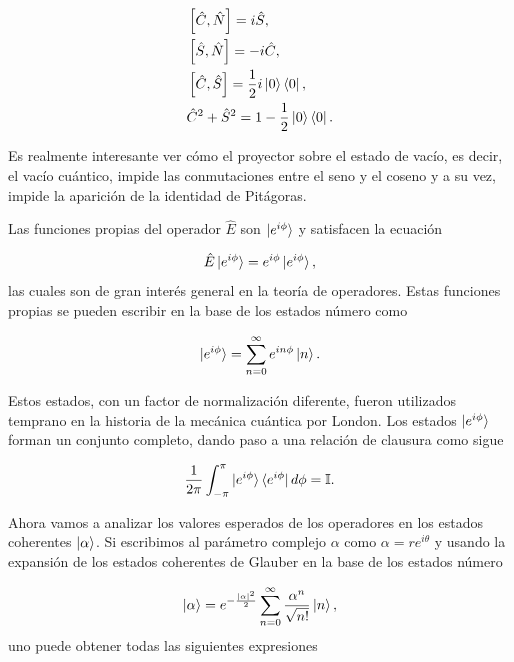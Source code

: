 	    \begin{align}
	        & \left[ \hat{C},\hat{N} \right] = i \hat{S},\\
	        & \left[ \hat{S},\hat{N} \right] = -i\hat{C},\\
	        & \left[ \hat{C},\hat{S} \right] = \frac{1}{2}i \ket{0}\bra{0},\\
	        & \hat{C}^2+\hat{S}^2 = 1 - \frac{1}{2}\ket{0}\bra{0}.
	    \end{align}
	
	    Es realmente interesante ver cómo el proyector sobre el estado de vacío, es decir, el vacío cuántico, impide las conmutaciones entre el seno y el coseno y a su vez, impide la aparición de la identidad de Pitágoras.
	
	    Las funciones propias del operador $\hat{E}$ son $\ket{e^{i\phi}}$ y satisfacen la ecuación
	
	    \begin{equation}
	        \hat{E}\ket{e^{i\phi}} = e^{i\phi}\ket{e^{i\phi}},
	    \end{equation}
	    las cuales son de gran interés general en la teoría de operadores. Estas funciones propias se pueden escribir en la base de los estados número como
	
	    \begin{equation}
	        \ket{e^{i\phi}} = \sum_{n=0}^\infty e^{in\phi}\ket{n}.
	    \end{equation}
	
	    Estos estados, con un factor de normalización diferente, fueron utilizados temprano en la historia de la mecánica cuántica por London. Los estados $\ket{e^{i\phi}}$ forman un conjunto completo, dando paso a una relación de clausura como sigue
	
	    \begin{equation}
	        \frac{1}{2\pi} \int_{-\pi}^\pi \ket{e^{i\phi}}\bra{e^{i\phi}}d\phi = \mathbb{I}.
	    \end{equation}

    Ahora vamos a analizar los valores esperados de los operadores en los estados coherentes $\ket{\alpha}$. Si escribimos al parámetro complejo $\alpha$ como $\alpha=re^{i\theta}$ y usando la expansión de los estados coherentes de Glauber en la base de los estados número

    \begin{equation}
        \ket{\alpha} = e^{-\frac{|\alpha|^2}{2}}\sum_{n=0}^\infty \frac{\alpha^n}{\sqrt{n!}}\ket{n},
    \end{equation}
    uno puede obtener todas las siguientes expresiones 

